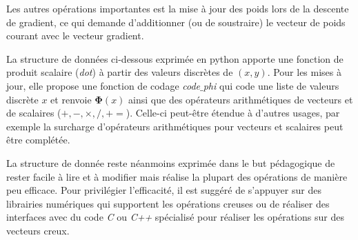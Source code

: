 \documentclass[11pt,openany]{book}
\begin{document}
Les autres opérations importantes est la mise à jour des poids lors de la descente de gradient, ce qui demande d'additionner (ou de soustraire) le vecteur de poids courant avec le vecteur gradient.

La structure de données ci-dessous exprimée en python apporte une fonction de produit scalaire ({\sl dot}) à partir des valeurs discrètes de $(x,y)$. Pour les mises à jour, elle propose une fonction de codage {\sl code$\_$phi} qui code une liste de valeurs discrète $x$ et renvoie $\boldsymbol\Phi(x)$ ainsi que des opérateurs arithmétiques de vecteurs et de scalaires ($+,-,\times, / , +=$).
Celle-ci peut-être étendue à d'autres usages, par exemple la surcharge d'opérateurs arithmétiques pour vecteurs et scalaires peut être complétée.

La structure de donnée reste néanmoins exprimée dans le but pédagogique de rester facile à lire et à modifier mais réalise la plupart des opérations de manière peu efficace.  Pour privilégier l'efficacité, il est suggéré de s'appuyer sur des librairies numériques qui supportent les opérations creuses ou de réaliser des interfaces avec du code {\sl C} ou {\sl C++} spécialisé pour réaliser les opérations sur des vecteurs creux.
\end{document}
